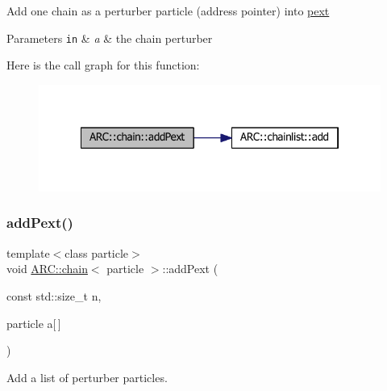 Add one chain as a perturber particle (address pointer) into \hyperlink{classARC_1_1chain_a6e4f41c7d3f8d44a4a01734ff4ab20cf}{pext} 
\begin{DoxyParams}[1]{Parameters}
\mbox{\tt in}  & {\em a} & the chain perturber \\
\hline
\end{DoxyParams}
Here is the call graph for this function\+:
\nopagebreak
\begin{figure}[H]
\begin{center}
\leavevmode
\includegraphics[width=322pt]{classARC_1_1chain_a5ab3934ce4a203cd57bfabcc3caf54b3_cgraph}
\end{center}
\end{figure}
\hypertarget{classARC_1_1chain_a71c8d6ac1e58694b8207aabc7266110f}{}\label{classARC_1_1chain_a71c8d6ac1e58694b8207aabc7266110f} 
\subsubsection{\texorpdfstring{add\+Pext()}{addPext()}\hspace{0.1cm}{\footnotesize\ttfamily [3/3]}}
{\footnotesize\ttfamily template$<$class particle$>$ \\
void \hyperlink{classARC_1_1chain}{A\+R\+C\+::chain}$<$ particle $>$\+::add\+Pext (\begin{DoxyParamCaption}\item[{const std\+::size\+\_\+t}]{n,  }\item[{particle}]{a\mbox{[}$\,$\mbox{]} }\end{DoxyParamCaption})\hspace{0.3cm}{\ttfamily [inline]}}



Add a list of perturber particles. 

